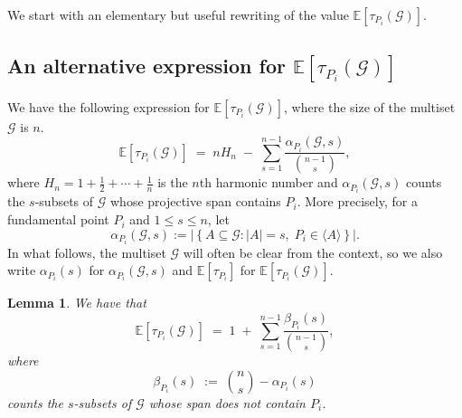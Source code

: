 \documentclass{article}
\newtheorem{lemma}{Lemma}
\newcommand{\Gscr}{\mathscr{G}}
\newcommand{\E}{\mathbb{E}}
\newcommand{\G}{\mathcal{G}}
\begin{document}
We start with an elementary but useful rewriting of the value $\E[\tau_{P_i}(\Gscr)]$.

\subsection{An alternative expression for \texorpdfstring{$\E[\tau_{P_i}(\Gscr)]$}{E[tau	extunderscore{P	extsubscript{i}}(G)]}}\label{subs:alt}

We have the following expression for $\E[\tau_{P_i}(\Gscr)]$, where the size of the multiset $\Gscr$ is $n$.
\begin{equation}\label{eq:alpha}
\E[\tau_{P_i}(\Gscr)] \;=\; n H_n \;-\; \sum_{s=1}^{n-1}\frac{\alpha_{P_i}(\G,s)}{\binom{n-1}{s}},
\end{equation}
where $H_n = 1+\tfrac{1}{2}+\cdots+\tfrac{1}{n}$ is the $n$th harmonic number and
$\alpha_{P_i}(\G,s)$ counts the $s$-subsets of $\G$ whose projective span
contains $P_i$.
More precisely, for a fundamental point $P_i$ and $1\le s\le n$, let
\[
\alpha_{P_i}(\Gscr,s)
:=
|\left\{
A\subseteq\Gscr:
|A|=s,\;
P_i\in\langle A\rangle
\right\}|.
\] In what follows, the multiset $\Gscr$ will often be clear from the context, so we also write $\alpha_{P_i}(s)$ for $\alpha_{P_i}(\Gscr,s)$ and $\E[\tau_{P_i}]$ for $\E[\tau_{P_i}(\Gscr)].$


\begin{lemma}\label{lem:alfabeta}\cite[Appendix A]{WangYaakobi2026}
We have that
\begin{equation}\label{eq:beta}
\E[\tau_{P_i}(\Gscr)] \;=\; 1 \;+\; \sum_{s=1}^{n-1}\frac{\beta_{P_i}(s)}{\binom{n-1}{s}},
\end{equation}
where
\[
\beta_{P_i}(s)\;:=\;\binom{n}{s}-\alpha_{P_i}(s)
\]
counts the $s$-subsets of $\Gscr$ whose span does not contain $P_i$. \end{lemma}


\end{document}
